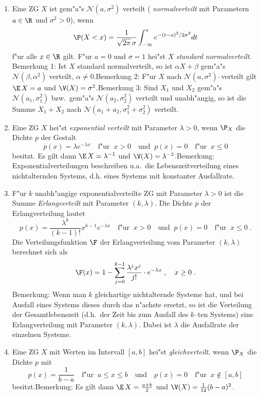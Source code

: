 \begin{enumerate}
\item
Eine ZG $X$ ist gem"a"s ${\mathcal N}(a,\sigma^2)$ verteilt ({\it
normalverteilt} mit Parametern $a\in\R$ und $\sigma^2>0$), wenn
\[\P(X<x)=\frac{1}{\sqrt{2\pi}\,\sigma}\int_{-\infty}^x
e^{-(t-a)^2/2\sigma^2}dt\] f"ur alle $x\in\R$ gilt. F"ur $a=0$ und
$\sigma=1$ hei"st $X$ {\it standard normalverteilt}.\newline
Bemerkung 1: Ist $X$ standard normalverteilt, so ist $\alpha
X+\beta$ gem"a"s ${\mathcal N}(\beta,\alpha^2)$ verteilt,
$\alpha\not=0$.\newline Bemerkung 2: F"ur $X$ nach ${\mathcal
N}(a,\sigma^2)$--verteilt gilt ${\E}\,X=a$ und
$\V(X)=\sigma^2$.\newline Bemerkung 3: Sind $X_1$ und $X_2$ gem"a"s
${\mathcal N}(a_1,\sigma_1^2)$ bzw.~gem"a"s ${\mathcal
N}(a_2,\sigma_2^2)$ verteilt und unabh"angig, so ist die Summe
$X_1+X_2$ nach ${\mathcal N}(a_1+a_2,\sigma_1^2+\sigma_2^2)$
verteilt.
\item
Eine ZG $X$ hei"st {\it exponential verteilt} mit Parameter
$\lambda>0$, wenn $\P_X$ die Dichte $p$ der Gestalt
\[p(x)=\lambda e^{-\lambda x}\quad\mbox{f"ur}\;\;x>0\quad\mbox{und}\;\;
p(x)=0\quad\mbox{f"ur}\;\;x\le 0\] besitzt. Es gilt dann
${\E}\,X=\lambda^{-1}$ und $\V(X)=\lambda^{-2}$.\newline Bemerkung:
Exponentialverteilungen beschreiben u.a.~die Lebenszeitverteilung
eines nichtalternden Systems, d.h. eines Systems mit konstanter
Ausfallrate.
\item
F"ur $k$ unabh"angige exponentialverteilte ZG mit Parameter
$\lambda>0$ ist die Summe {\it Erlangverteilt} mit Parameter
$(k,\lambda)$. Die Dichte $p$ der Erlangverteilung lautet
\[p(x)=\frac{\lambda^k}{(k-1)!}x^{k-1}e^{-\lambda x}\quad\mbox{f"ur}\;\;x>0
\quad\mbox{und}\;\;p(x)=0\quad\mbox{f"ur}\;\;x\le 0\;.\] Die
Verteilungsfunktion $\F$ der Erlangverteilung vom Parameter
$(k,\lambda)$ berechnet sich als
\[\F(x)=1-\sum_{j=0}^{k-1}\frac{\lambda^j x^j}{j!}\cdot
e^{-\lambda x}\;,\quad x\ge 0\;.\] Bemerkung: Wenn man $k$
gleichartige nichtalternde Systeme hat, und bei Ausfall eines
Systems dieses durch das n"achste ersetzt, so ist die Verteilung der
Gesamtlebenszeit (d.h.~der Zeit bis zum Ausfall des $k$--ten
Systems) eine Erlangverteilung mit Parameter $(k, \lambda)$. Dabei
ist $\lambda$ die Ausfallrate der einzelnen Systeme.
\item
Eine ZG $X$ mit Werten im Intervall $[a,b]$ hei"st {\it
gleichverteilt}, wenn $\P_X$ die Dichte $p$ mit
\[p(x)=\frac{1}{b-a}\quad\mbox{f"ur}\;\;a\le x\le b\quad\mbox{und}\quad p(x)=0
\quad\mbox{f"ur}\;\; x\notin [a,b]\] besitzt.\newline Bemerkung: Es
gilt dann ${\E}\,X=\frac{a+b}{2}$ und ${\V}(X)=\frac{1}{12}(b-a)^2$.
\end{enumerate}
